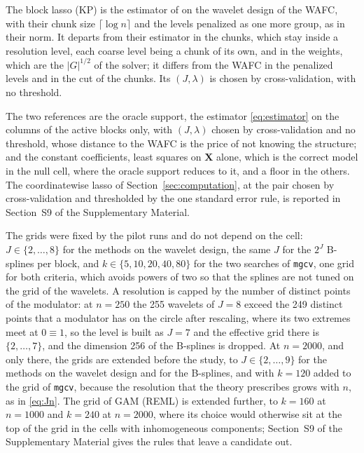 \documentclass[12pt]{article} %
\theoremstyle{definition}
\theoremstyle{plain}
\newcommand{\bX}{\mathbf{X}}
\newcommand{\pen}{\lambda}
\begin{document}
{The block lasso (KP) is the estimator of \citet{Klopp-Pensky-2015} on the
wavelet design of the WAFC, with their chunk size $\lceil\log n\rceil$ and the
levels penalized as one more group, as in their norm. It departs from their
estimator in the chunks, which stay inside a resolution level, each coarse
level being a chunk of its own, and in the weights, which are the $|G|^{1/2}$
of the solver; it differs from the WAFC in the penalized levels and in the
cut of the chunks. Its $(J,\pen)$ is chosen by cross-validation, with no
threshold.

The two references are the oracle support, the estimator
\eqref{eq:estimator} on the columns of the active blocks only, with $(J,\pen)$
chosen by cross-validation and no threshold, whose distance to the WAFC is the
price of not knowing the structure; and the constant coefficients, least
squares on $\bX$ alone, which is the correct model in the null cell, where the
oracle support reduces to it, and a floor in the others. The coordinatewise
lasso of Section~\ref{sec:computation}, at the pair chosen by
cross-validation and thresholded by the one standard error rule, is reported
in Section~S9 of the Supplementary Material.

The grids were fixed by the pilot runs and do not depend on the cell:
$J \in \{2,\dots,8\}$ for the methods on the wavelet design, the same $J$ for
the $2^J$ B-splines per block, and $k \in \{5, 10, 20, 40, 80\}$ for the two
searches of \texttt{mgcv}, one grid for both criteria, which avoids powers of
two so that the splines are not tuned on the grid of the wavelets. A
resolution is capped by the number of distinct points of the modulator: at
$n = 250$ the 255 wavelets of $J = 8$ exceed the 249 distinct points that a
modulator has on the circle after rescaling, where its two extremes meet at
$0 \equiv 1$, so the level is built as $J = 7$ and the effective grid there
is $\{2,\dots,7\}$, and the dimension 256 of the B-splines is dropped. At
$n = 2000$, and only there, the grids are extended before the study, to
$J \in \{2,\dots,9\}$ for the methods on the wavelet design and for the
B-splines, and with $k = 120$ added to the grid of \texttt{mgcv}, because the
resolution that the theory prescribes grows with $n$, as in \eqref{eq:Jn}.
The grid of GAM (REML) is extended further, to $k = 160$ at $n = 1000$ and
$k = 240$ at $n = 2000$, where its choice would otherwise sit at the top of
the grid in the cells with inhomogeneous components; Section~S9 of the
Supplementary Material gives the rules that leave a candidate out.

}
\end{document}
